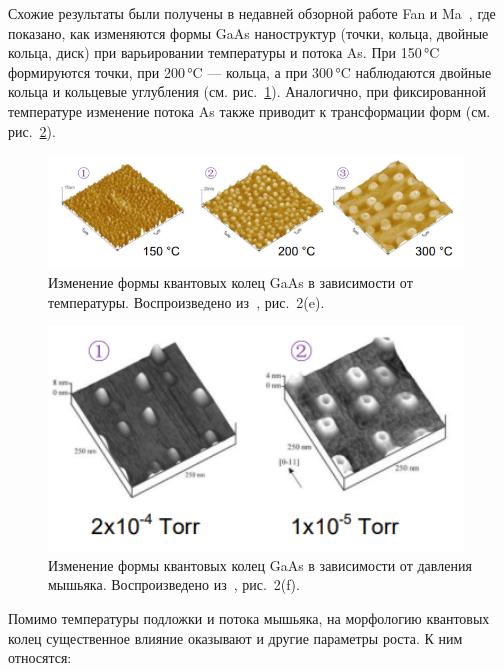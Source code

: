 \documentclass[14pt,oneside]{extarticle}
\begin{document}
Схожие результаты были получены в недавней обзорной работе Fan и Ma~\cite{fan2023}, где показано, как изменяются формы GaAs наноструктур (точки, кольца, двойные кольца, диск) при варьировании температуры и потока As. При 150 °C формируются точки, при 200 °C — кольца, а при 300 °C наблюдаются двойные кольца и кольцевые углубления (см. рис.~\ref{fig:fanma_temp}). Аналогично, при фиксированной температуре изменение потока As также приводит к трансформации форм (см. рис.~\ref{fig:fanma_pressure}).

\begin{figure}
    \begin{center}
        \includegraphics[width=11cm]{images/fanma_fig2e_left.png}
        \caption{\label{fig:fanma_temp}
            Изменение формы квантовых колец GaAs в зависимости от температуры. Воспроизведено из~\cite{fan2023}, рис.~2(e).}
    \end{center}
\end{figure}

\begin{figure}
    \begin{center}
        \includegraphics[width=11cm]{images/fanma_fig2e_right.png}
        \caption{\label{fig:fanma_pressure}
            Изменение формы квантовых колец GaAs в зависимости от давления мышьяка. Воспроизведено из~\cite{fan2023}, рис.~2(f).}
    \end{center}
\end{figure}

Помимо температуры подложки и потока мышьяка, на морфологию квантовых колец существенное влияние оказывают и другие параметры роста. К ним относятся:
\end{document}
